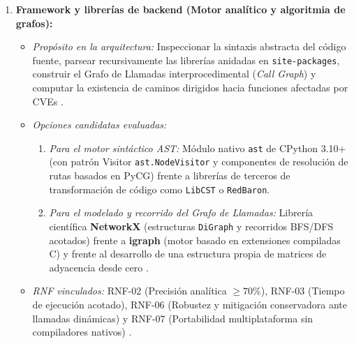 \begin{enumerate}
    \item \textbf{Framework y librerías de backend (Motor analítico y algoritmia de grafos):}
    \begin{itemize}
        \item \textit{Propósito en la arquitectura:} Inspeccionar la sintaxis abstracta del código fuente, parsear recursivamente las librerías anidadas en \texttt{site-\allowbreak packages}, construir el Grafo de Llamadas interprocedimental (\textit{Call Graph}) y computar la existencia de caminos dirigidos hacia funciones afectadas por CVEs \cite{salis2021pycg, ryder1979constructing}.
        \item \textit{Opciones candidatas evaluadas:}
        \begin{enumerate}[label=\alph*)]
            \item \textit{Para el motor sintáctico AST:} Módulo nativo \texttt{ast} de CPython 3.10+ (con patrón Visitor \texttt{ast.\allowbreak NodeVisitor} y componentes de resolución de rutas basados en PyCG) frente a librerías de terceros de transformación de código como \texttt{LibCST} o \texttt{RedBaron}.
            \item \textit{Para el modelado y recorrido del Grafo de Llamadas:} Librería científica \textbf{NetworkX} (estructuras \texttt{DiGraph} y recorridos BFS/DFS acotados) frente a \textbf{igraph} (motor basado en extensiones compiladas C) y frente al desarrollo de una estructura propia de matrices de adyacencia desde cero \cite{hagberg2008exploring}.
        \end{enumerate}
        \item \textit{RNF vinculados:} RNF-02 (Precisión analítica $\ge 70\%$), RNF-03 (Tiempo de ejecución acotado), RNF-06 (Robustez y mitigación conservadora ante llamadas dinámicas) y RNF-07 (Portabilidad multiplataforma sin compiladores nativos) \cite{pashchenko2022vuln4real, nielson1999principles}.
    \end{itemize}


\end{enumerate}
